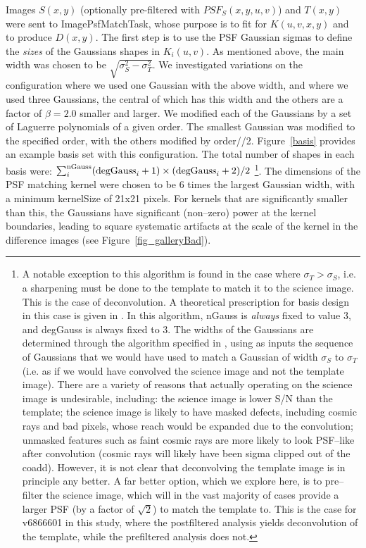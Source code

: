\documentclass[prd, nofootinbib, floatfix, 11pt,tightenlines,times]{article}
\begin{document}
Images $S(x,y)$ (optionally pre-filtered with $PSF_S(x,y,u,v)$) and
$T(x,y)$ were sent to ImagePsfMatchTask, whose purpose is to fit for
$K(u,v,x,y)$ and to produce $D(x,y)$.  The first step is to use the
PSF Gaussian sigmas to define the {\it sizes} of the Gaussians shapes
in $K_i(u,v)$.  As mentioned above, the main width was chosen to be
$\sqrt{\sigma_S^2 - \sigma_T^2}$.  We investigated variations on the
configuration where we used one Gaussian with the above width, and
where we used three Gaussians, the central of which has this width and
the others are a factor of $\beta = 2.0$ smaller and larger.  We
modified each of the Gaussians by a set of Laguerre polynomials of a
given order.  The smallest Gaussian was modified to the specified
order, with the others modified by order//2.  Figure~\ref{basis}
provides an example basis set with this configuration.  The total
number of shapes in each basis were: $\sum_i^{\rm nGauss} ({\rm
  degGauss}_i+1)\times({\rm degGauss}_i+2)/2$ \footnote{ A notable
  exception to this algorithm is found in the case where $\sigma_T >
  \sigma_S$, i.e. a sharpening must be done to the template to match
  it to the science image.  This is the case of deconvolution.  A
  theoretical prescription for basis design in this case is given in
  \cite{0266-5611-26-8-085002}.  In this algorithm, nGauss is {\it
    always} fixed to value 3, and degGauss is always fixed to 3.  The
  widths of the Gaussians are determined through the algorithm
  specified in \cite{0266-5611-26-8-085002}, using as inputs the
  sequence of Gaussians that we would have used to match a Gaussian of
  width $\sigma_S$ to $\sigma_T$ (i.e. as if we would have convolved
  the science image and not the template image).  There are a variety
  of reasons that actually operating on the science image is
  undesirable, including: the science image is lower S/N than the
  template; the science image is likely to have masked defects,
  including cosmic rays and bad pixels, whose reach would be expanded
  due to the convolution; unmasked features such as faint cosmic rays
  are more likely to look PSF--like after convolution (cosmic rays
  will likely have been sigma clipped out of the coadd).  However, it
  is not clear that deconvolving the template image is in principle
  any better.  A far better option, which we explore here, is to
  pre--filter the science image, which will in the vast majority of
  cases provide a larger PSF (by a factor of $\sqrt{2}$) to match the
  template to.  This is the case for v6866601 in this study, where the
  postfiltered analysis yields deconvolution of the template, while
  the prefiltered analysis does not.  }.
%
The dimensions of the PSF matching kernel were chosen to be 6 times
the largest Gaussian width, with a minimum kernelSize of 21x21 pixels.
For kernels that are significantly smaller than this, the Gaussians
have significant (non--zero) power at the kernel boundaries, leading
to square systematic artifacts at the scale of the kernel in the
difference images (see Figure~\ref{fig_galleryBad}).
\end{document}

